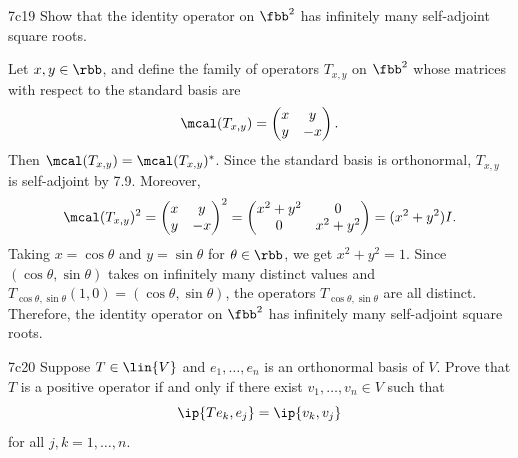 \begin{exercise}{7c19}
    Show that the identity operator on $\fbb^2$ has infinitely many self-adjoint square roots.
\end{exercise}

\begin{sol}
    Let $x, y \in \rbb$, and define the family of operators $T_{x, y}$ on $\fbb^2$ whose matrices with respect to the standard basis are
    \[
        \mcal(T_{x, y}) =
        \begin{pmatrix}
            x & y \\
            y & -x
        \end{pmatrix}.
    \]
    Then $\mcal(T_{x, y}) = \mcal(T_{x, y})^*$.
    Since the standard basis is orthonormal, $T_{x, y}$ is self-adjoint by 7.9.
    Moreover,
    \[
        \mcal(T_{x, y})^2 =
        \begin{pmatrix}
            x & y \\
            y & -x
        \end{pmatrix}^2
        =
        \begin{pmatrix}
            x^2 + y^2 & 0 \\
            0 & x^2 + y^2
        \end{pmatrix} = (x^2 + y^2) I.
    \]
    Taking $x = \cos \theta$ and $y = \sin \theta$ for $\theta \in \rbb$, we get $x^2 + y^2 = 1$.
    Since $(\cos \theta, \sin \theta)$ takes on infinitely many distinct values and $T_{\cos \theta, \sin \theta}(1, 0) = (\cos \theta, \sin \theta)$, the operators $T_{\cos \theta, \sin \theta}$ are all distinct.
    Therefore, the identity operator on $\fbb^2$ has infinitely many self-adjoint square roots.
\end{sol}

\begin{exercise}{7c20}
    Suppose $T \in \lin{V}$ and $e_1, \ldots, e_n$ is an orthonormal basis of $V$.
    Prove that $T$ is a positive operator if and only if there exist $v_1, \ldots, v_n \in V$ such that
    \[
        \ip{Te_k, e_j} = \ip{v_k, v_j}
    \]
    for all $j, k = 1, \ldots, n$.

\end{exercise}

